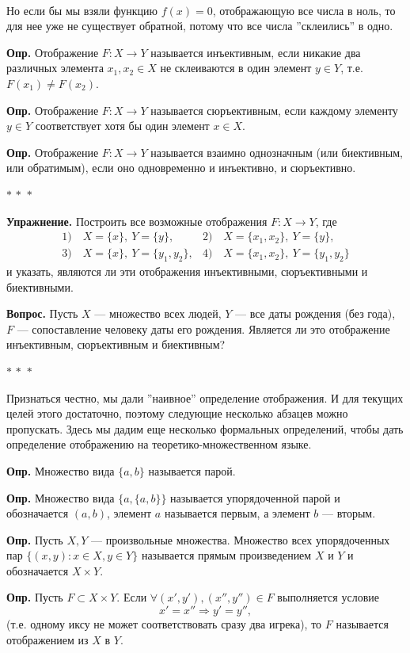 \documentclass[a4paper,12pt]{article}
\newcommand{\threestars}{\begin{center}$ {\ast}\,{\ast}\,{\ast} $\end{center}}
\newcounter{th-counter}
\newcounter{df-counter}
\newcommand{\df}{\par\noindent\textbf{Опр.} }
\begin{document}
\

Но если бы мы взяли функцию $f(x) = 0$, отображающую все числа в ноль, то для нее уже не существует обратной, потому что все числа ''склеились'' в одно.

\df Отображение $F : X \rightarrow Y$ называется инъективным, если никакие два различных элемента $x_1, x_2 \in X$ не склеиваются в один элемент $y \in Y$, т.е. $F(x_1) \neq F(x_2)$.

\df Отображение $F : X \rightarrow Y$ называется сюръективным, если каждому элементу $y \in Y$ соответствует хотя бы один элемент $x \in X$.

\df Отображение $F : X \rightarrow Y$ называется взаимно однозначным (или биективным, или обратимым), если оно одновременно и инъективно, и сюръективно.

\threestars

\noindent\textbf{Упражнение.} Построить все возможные отображения $F: X \rightarrow Y$, где
\[ 
\begin{array}{ll}
     1)\quad X = \{x\}, \ Y = \{y\}, &2) \quad X = \{x_1, x_2\}, \ Y = \{y\},\\
     3)\quad X = \{x\}, \ Y = \{y_1, y_2\},  & 4) \quad X = \{x_1, x_2\}, \ Y = \{y_1, y_2\}
\end{array}
\]
и указать, являются ли эти отображения инъективными, сюръективными и биективными.

\noindent\textbf{Вопрос.} Пусть $X$ --- множество всех людей, $Y$ --- все даты рождения (без года), $F$ --- сопоставление человеку даты его рождения. Является ли это отображение инъективным, сюръективным и биективным?

\threestars
Признаться честно, мы дали ''наивное'' определение отображения. И для текущих целей этого достаточно, поэтому следующие несколько абзацев можно пропускать. Здесь мы дадим еще несколько формальных определений, чтобы дать определение отображению на теоретико-множественном языке.

\df Множество вида $\{a,b\}$ называется парой.

\df Множество вида $\{a, \{a,b\}\}$ называется упорядоченной парой и обозначается $(a,b)$, элемент $a$ называется первым, а элемент $b$ --- вторым.

\df Пусть $X,Y$ --- произвольные множества. Множество всех упорядоченных пар $\{(x,y): x \in X, y \in Y\}$ называется прямым произведением $X$ и $Y$ и обозначается $X \times Y$.

\df Пусть $F \subset X \times Y$. Если $\forall (x', y'), (x'', y'') \in F$ выполняется условие \[x' = x'' \Rightarrow y' = y'',\]
(т.е. одному иксу не может соответствовать сразу два игрека), то $F$ называется отображением из $X$ в $Y$.
\end{document}
